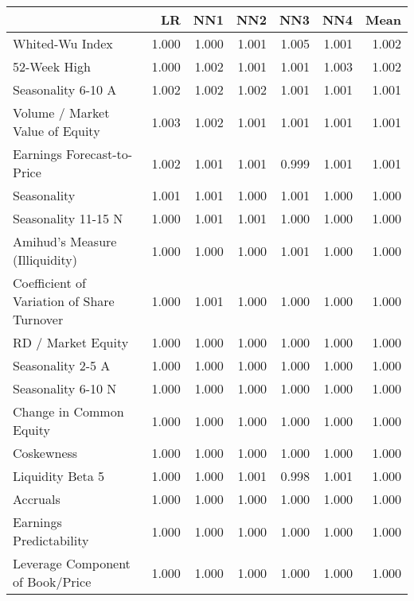 \begin{tabular}{lrrrrrr}
\toprule
{} &     LR &    NN1 &    NN2 &    NN3 &    NN4 &   Mean \\
\midrule
Whited-Wu Index                            &  1.000 &  1.000 &  1.001 &  1.005 &  1.001 &  1.002 \\
52-Week High                               &  1.000 &  1.002 &  1.001 &  1.001 &  1.003 &  1.002 \\
Seasonality 6-10 A                         &  1.002 &  1.002 &  1.002 &  1.001 &  1.001 &  1.001 \\
Volume / Market Value of Equity            &  1.003 &  1.002 &  1.001 &  1.001 &  1.001 &  1.001 \\
Earnings Forecast-to-Price                 &  1.002 &  1.001 &  1.001 &  0.999 &  1.001 &  1.001 \\
Seasonality                                &  1.001 &  1.001 &  1.000 &  1.001 &  1.000 &  1.000 \\
Seasonality 11-15 N                        &  1.000 &  1.001 &  1.001 &  1.000 &  1.000 &  1.000 \\
Amihud's Measure (Illiquidity)             &  1.000 &  1.000 &  1.000 &  1.001 &  1.000 &  1.000 \\
Coefficient of Variation of Share Turnover &  1.000 &  1.001 &  1.000 &  1.000 &  1.000 &  1.000 \\
RD / Market Equity                         &  1.000 &  1.000 &  1.000 &  1.000 &  1.000 &  1.000 \\
Seasonality 2-5 A                          &  1.000 &  1.000 &  1.000 &  1.000 &  1.000 &  1.000 \\
Seasonality 6-10 N                         &  1.000 &  1.000 &  1.000 &  1.000 &  1.000 &  1.000 \\
Change in Common Equity                    &  1.000 &  1.000 &  1.000 &  1.000 &  1.000 &  1.000 \\
Coskewness                                 &  1.000 &  1.000 &  1.000 &  1.000 &  1.000 &  1.000 \\
Liquidity Beta 5                           &  1.000 &  1.000 &  1.001 &  0.998 &  1.001 &  1.000 \\
Accruals                                   &  1.000 &  1.000 &  1.000 &  1.000 &  1.000 &  1.000 \\
Earnings Predictability                    &  1.000 &  1.000 &  1.000 &  1.000 &  1.000 &  1.000 \\
Leverage Component of Book/Price           &  1.000 &  1.000 &  1.000 &  1.000 &  1.000 &  1.000 \\

\end{tabular}
